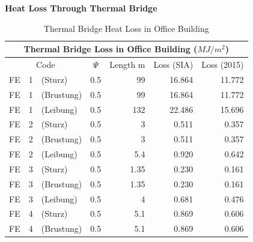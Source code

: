 \documentclass[a4paper, oneside]{discothesis}
\begin{document}
		\textbf{Heat Loss Through Thermal Bridge}\\

\begin{table}[H]
\centering
\small
\caption{Thermal Bridge Heat Loss in Office Building}
    \begin{tabular}{ccccrrr}
    \toprule
    \multicolumn{7}{c}{Thermal Bridge Loss in Office Building ($MJ/m^2$)} \\
    \hline
    \multicolumn{3}{c}{Code} & \multicolumn{1}{p{2.785em}}{$\Psi$} & \multicolumn{1}{c}{Length\newline{} m} & \multicolumn{1}{p{3em}}{Loss (SIA)} & \multicolumn{1}{p{3em}}{Loss (2015)} \\
    \multicolumn{1}{l}{FE} & \multicolumn{1}{r}{1} & \multicolumn{1}{l}{(Sturz)} & \multicolumn{1}{r}{0.5} & 99   & 16.864 & 11.772 \\
    \multicolumn{1}{l}{FE} & \multicolumn{1}{r}{1} & \multicolumn{1}{l}{(Brustung)} & \multicolumn{1}{r}{0.5} & 99   & 16.864 & 11.772 \\
    \multicolumn{1}{l}{FE} & \multicolumn{1}{r}{1} & \multicolumn{1}{l}{(Leibung)} & \multicolumn{1}{r}{0.5} & 132  & 22.486 & 15.696 \\
    \multicolumn{1}{l}{FE} & \multicolumn{1}{r}{2} & \multicolumn{1}{l}{(Sturz)} & \multicolumn{1}{r}{0.5} & 3    & 0.511 & 0.357 \\
    \multicolumn{1}{l}{FE} & \multicolumn{1}{r}{2} & \multicolumn{1}{l}{(Brustung)} & \multicolumn{1}{r}{0.5} & 3    & 0.511 & 0.357 \\
    \multicolumn{1}{l}{FE} & \multicolumn{1}{r}{2} & \multicolumn{1}{l}{(Leibung)} & \multicolumn{1}{r}{0.5} & 5.4  & 0.920 & 0.642 \\
    \multicolumn{1}{l}{FE} & \multicolumn{1}{r}{3} & \multicolumn{1}{l}{(Sturz)} & \multicolumn{1}{r}{0.5} & 1.35 & 0.230 & 0.161 \\
    \multicolumn{1}{l}{FE} & \multicolumn{1}{r}{3} & \multicolumn{1}{l}{(Brustung)} & \multicolumn{1}{r}{0.5} & 1.35 & 0.230 & 0.161 \\
    \multicolumn{1}{l}{FE} & \multicolumn{1}{r}{3} & \multicolumn{1}{l}{(Leibung)} & \multicolumn{1}{r}{0.5} & 4    & 0.681 & 0.476 \\
    \multicolumn{1}{l}{FE} & \multicolumn{1}{r}{4} & \multicolumn{1}{l}{(Sturz)} & \multicolumn{1}{r}{0.5} & 5.1  & 0.869 & 0.606 \\
    \multicolumn{1}{l}{FE} & \multicolumn{1}{r}{4} & \multicolumn{1}{l}{(Brustung)} & \multicolumn{1}{r}{0.5} & 5.1  & 0.869 & 0.606 \\

\end{tabular}
\end{table}
\end{document}
